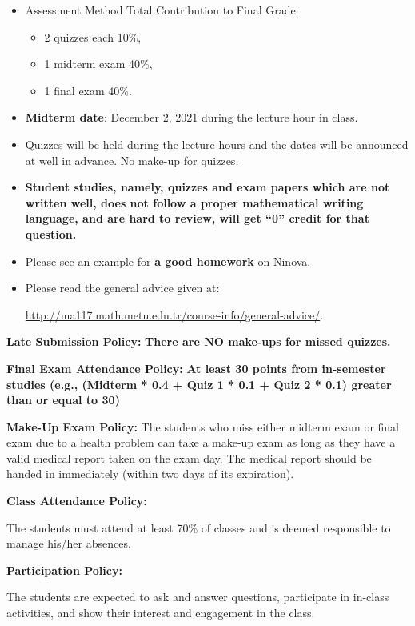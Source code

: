 \documentclass[
  12pt,
]{article}
\providecommand{\tightlist}{%
  \setlength{\itemsep}{0pt}\setlength{\parskip}{0pt}}
\begin{document}
\begin{itemize}
\item
  Assessment Method \quad      \quad \quad                Total
  Contribution to Final Grade:

  \begin{itemize}
  \tightlist
  \item
    2 quizzes each 10\%,\\
  \item
    1 midterm exam 40\%,
  \item
    1 final exam 40\%.
  \end{itemize}
\item
  \textbf{Midterm date}: December 2, 2021 during the lecture hour in
  class.
\item
  Quizzes will be held during the lecture hours and the dates will be
  announced at well in advance. No make-up for quizzes.
\item
  \textbf{Student studies, namely, quizzes and exam papers which are not
  written well, does not follow a proper mathematical writing language,
  and are hard to review, will get ``0'' credit for that question.}
\item
  Please see an example for \textbf{a good homework} on Ninova.
\item
  Please read the general advice given at:

  \url{http://ma117.math.metu.edu.tr/course-info/general-advice/}.
\end{itemize}

\textbf{Late Submission Policy:} \textbf{There are \textbf{NO} make-ups
for missed quizzes. }

\textbf{Final Exam Attendance Policy:} \textbf{At least 30 points from
in-semester studies (e.g., (Midterm * 0.4 + Quiz 1 * 0.1 + Quiz 2 * 0.1)
greater than or equal to 30)}

\textbf{Make-Up Exam Policy:} The students who miss either midterm exam
or final exam due to a health problem can take a make-up exam as long as
they have a valid medical report taken on the exam day. The medical
report should be handed in immediately (within two days of its
expiration).

\textbf{Class Attendance Policy:}

The students must attend at least 70\% of classes and is deemed
responsible to manage his/her absences.

\textbf{Participation Policy:}

The students are expected to ask and answer questions, participate in
in-class activities, and show their interest and engagement in the
class.
\end{document}
